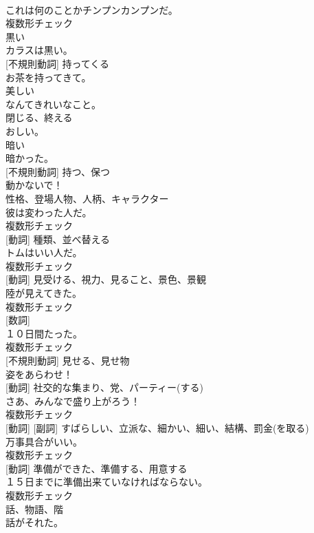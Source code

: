 \documentclass[8pt]{extreport}
\begin{document}
\begin{CJK}{UTF8}{min}
\\	これは何のことかチンプンカンプンだ。	
\\	複数形チェック
\\	[形容詞]	黒い	
\\	カラスは黒い。	
\\	[動詞] [不規則動詞]	持ってくる	
\\	お茶を持ってきて。	
\\	[形容詞]	美しい	
\\	なんてきれいなこと。	
\\	[動詞]	閉じる、終える	
\\	おしい。	
\\	[形容詞]	暗い	
\\	暗かった。	
\\	[動詞] [不規則動詞]	持つ、保つ	
\\	動かないで！	
\\	[名詞]	性格、登場人物、人柄、キャラクター	
\\	彼は変わった人だ。	
\\	複数形チェック
\\	[名詞] [動詞]	種類、並べ替える	
\\	トムはいい人だ。	
\\	複数形チェック
\\	[名詞] [動詞]	見受ける、視力、見ること、景色、景観	
\\	陸が見えてきた。	
\\	複数形チェック
\\	[名詞] [数詞]	
\\	１０日間たった。	
\\	複数形チェック
\\	[動詞] [不規則動詞]	見せる、見せ物	
\\	姿をあらわせ！	
\\	[名詞] [動詞]	社交的な集まり、党、パーティー(する)	
\\	さあ、みんなで盛り上がろう！	
\\	複数形チェック
\\	[名詞] [動詞] [副詞]	すばらしい、立派な、細かい、細い、結構、罰金(を取る)	
\\	万事具合がいい。	
\\	複数形チェック
\\	[名詞] [動詞]	準備ができた、準備する、用意する	
\\	１５日までに準備出来ていなければならない。	
\\	複数形チェック
\\	[名詞]	話、物語、階	
\\	話がそれた。	

\end{CJK}
\end{document}
